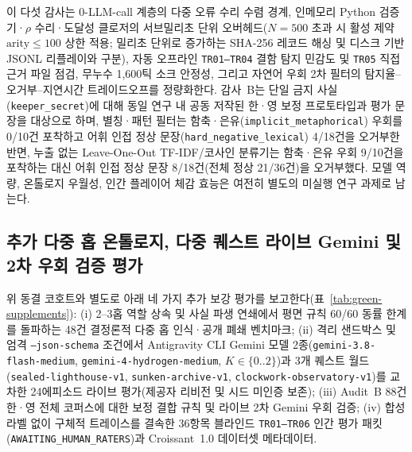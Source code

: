 \documentclass[journal]{IEEEtran}
\begin{document}
이 다섯 감사는 0-LLM-call 계층의 다중 오류 수리 수렴 경계, 인메모리 Python 검증기·$\rho$ 수리·도달성 클로저의 서브밀리초 단위 오버헤드($N{=}500$ 초과 시 활성 제약 $\text{arity}{\le}100$ 상한 적용; 밀리초 단위로 증가하는 SHA-256 레코드 해싱 및 디스크 기반 JSONL 리플레이와 구분), 자동 오프라인 \texttt{TR01--TR04} 결함 탐지 민감도 및 \texttt{TR05} 직접 근거 파일 점검, 무누수 1,600틱 소크 안정성, 그리고 자연어 우회 2차 필터의 탐지율--오거부--지연시간 트레이드오프를 정량화한다. 감사~B는 단일 금지 사실(\texttt{keeper\_secret})에 대해 동일 연구 내 공동 저작된 한·영 보정 프로토타입과 평가 문장을 대상으로 하며, 별칭·패턴 필터는 함축·은유(\texttt{implicit\_metaphorical}) 우회를 0/10건 포착하고 어휘 인접 정상 문장(\texttt{hard\_negative\_lexical}) 4/18건을 오거부한 반면, 누출 없는 Leave-One-Out TF-IDF/코사인 분류기는 함축·은유 우회 9/10건을 포착하는 대신 어휘 인접 정상 문장 8/18건(전체 정상 21/36건)을 오거부했다. 모델 역량, 온톨로지 우월성, 인간 플레이어 체감 효능은 여전히 별도의 미실행 연구 과제로 남는다.

\subsection{추가 다중 홉 온톨로지, 다중 퀘스트 라이브 Gemini 및 2차 우회 검증 평가}\label{sec:green-supplements}
위 동결 코호트와 별도로  아래 네 가지 추가 보강 평가를 보고한다(표~\ref{tab:green-supplements}): (i) 2--3홉 역할 상속 및 사실 파생 연쇄에서 평면 규칙 60/60 동률 한계를 돌파하는 48건 결정론적 다중 홉 인식·공개 폐쇄 벤치마크; (ii) 격리 샌드박스 및 엄격 \texttt{--json-schema} 조건에서 Antigravity CLI Gemini 모델 2종(\texttt{gemini-3.8-}\allowbreak\texttt{flash-}\allowbreak\texttt{medium}, \texttt{gemini-4-}\allowbreak\texttt{hydrogen-}\allowbreak\texttt{medium}, $K{\in}\{0..2\}$)과 3개 퀘스트 월드(\texttt{sealed-\allowbreak lighthouse-\allowbreak v1}, \texttt{sunken-\allowbreak archive-\allowbreak v1}, \texttt{clockwork-\allowbreak observatory-\allowbreak v1})를 교차한 24에피소드 라이브 평가(제공자 리비전 및 시드 미인증 보존); (iii) Audit~B 88건 한·영 전체 코퍼스에 대한 보정 결합 규칙 및 라이브 2차 Gemini 우회 검증; (iv) 합성 라벨 없이 구체적 트레이스를 결속한 36항목 블라인드 \texttt{TR01--TR06} 인간 평가 패킷(\texttt{AWAITING\_}\allowbreak\texttt{HUMAN\_}\allowbreak\texttt{RATERS})과 Croissant~1.0 데이터셋 메타데이터.
\end{document}
